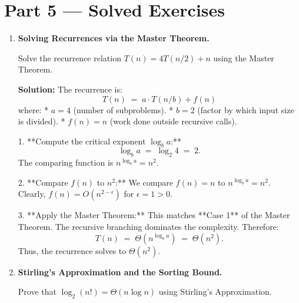 \documentclass[12pt, a4paper]{book}
\begin{document}
\section{Part 5 --- Solved Exercises}

\begin{problembox}
\begin{enumerate}[label=\textbf{E\arabic*.}]
  \item \textbf{Solving Recurrences via the Master Theorem.}
  
        Solve the recurrence relation $T(n) = 4 T(n/2) + n$ using the Master Theorem.
        
        \textbf{Solution:}
        The recurrence is:
        \[
          T(n) \;=\; a \cdot T(n/b) + f(n)
        \]
        where:
        * $a = 4$ (number of subproblems).
        * $b = 2$ (factor by which input size is divided).
        * $f(n) = n$ (work done outside recursive calls).
        
        1. **Compute the critical exponent $\log_b a$:**
           \[
             \log_b a \;=\; \log_2 4 \;=\; 2.
           \]
           The comparing function is $n^{\log_b a} = n^2$.
           
        2. **Compare $f(n)$ to $n^2$:**
           We compare $f(n) = n$ to $n^{\log_b a} = n^2$.
           Clearly, $f(n) = O(n^{2 - \epsilon})$ for $\epsilon = 1 > 0$.
           
        3. **Apply the Master Theorem:**
           This matches **Case 1** of the Master Theorem.
           The recursive branching dominates the complexity.
           Therefore:
           \[
             T(n) \;=\; \Theta\left( n^{\log_b a} \right) \;=\; \Theta\left( n^2 \right).
           \]
           Thus, the recurrence solves to $\Theta(n^2)$.
           
  \item \textbf{Stirling's Approximation and the Sorting Bound.}
  
        Prove that $\log_2(n!) = \Theta(n \log n)$ using Stirling's Approximation.
        

\end{enumerate}
\end{problembox}
\end{document}
